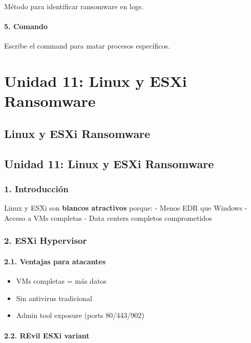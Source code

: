 \documentclass[
  letterpaper,
]{report}
\providecommand{\tightlist}{%
  \setlength{\itemsep}{0pt}\setlength{\parskip}{0pt}}
\begin{document}
Método para identificar ransomware en logs.

\subsection{5. Comando}\label{comando-8}

Escribe el command para matar procesos específicos.

\part{Unidad 11: Linux y ESXi Ransomware}

\chapter{Linux y ESXi Ransomware}\label{linux-y-esxi-ransomware}

\chapter{Unidad 11: Linux y ESXi
Ransomware}\label{unidad-11-linux-y-esxi-ransomware-1}

\section{1. Introducción}\label{introducciuxf3n-10}

Linux y ESXi son \textbf{blancos atractivos} porque: - Menos EDR que
Windows - Acceso a VMs completas - Data centers completos comprometidos

\section{2. ESXi Hypervisor}\label{esxi-hypervisor}

\subsection{2.1. Ventajas para atacantes}\label{ventajas-para-atacantes}

\begin{itemize}
\tightlist
\item
  VMs completas = más datos
\item
  Sin antivirus tradicional
\item
  Admin tool exposure (ports 80/443/902)
\end{itemize}

\subsection{2.2. REvil ESXi variant}\label{revil-esxi-variant}
\end{document}
